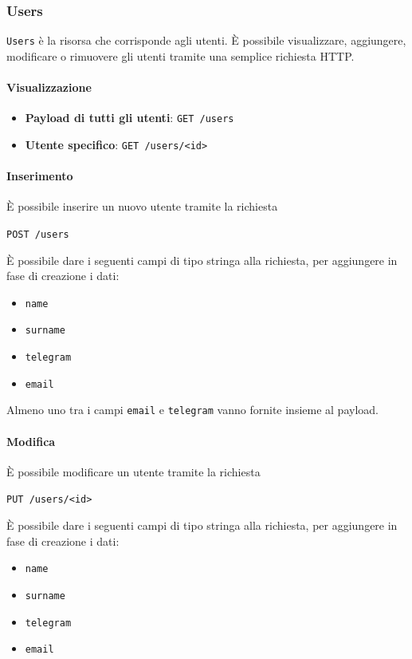 \subsubsection{Users}

\texttt{Users} è la risorsa che corrisponde agli utenti.
È possibile visualizzare, aggiungere, modificare o rimuovere gli utenti tramite una semplice
richiesta HTTP.

\paragraph{Visualizzazione}

\begin{itemize}
    \item \textbf{Payload di tutti gli utenti}: \texttt{GET /users}
    \item \textbf{Utente specifico}: \texttt{GET /users/<id>}
\end{itemize}

\paragraph{Inserimento}
È possibile inserire un nuovo utente tramite la richiesta
    \begin{center}
        \texttt{POST /users}
    \end{center}

È possibile dare i seguenti campi di tipo stringa alla richiesta, per aggiungere in fase di creazione i dati:
\begin{itemize}[noitemsep]
    \item \texttt{name}
    \item \texttt{surname}
    \item \texttt{telegram}
    \item \texttt{email}
\end{itemize}
Almeno uno tra i campi \texttt{email} e \texttt{telegram} vanno fornite insieme al payload.

\paragraph{Modifica}

È possibile modificare un utente tramite la richiesta
\begin{center}
    \texttt{PUT /users/<id>}
\end{center}
È possibile dare i seguenti campi di tipo stringa alla richiesta, per aggiungere in fase di creazione i dati:
\begin{itemize}[noitemsep]
    \item \texttt{name}
    \item \texttt{surname}
    \item \texttt{telegram}
    \item \texttt{email}
\end{itemize}


